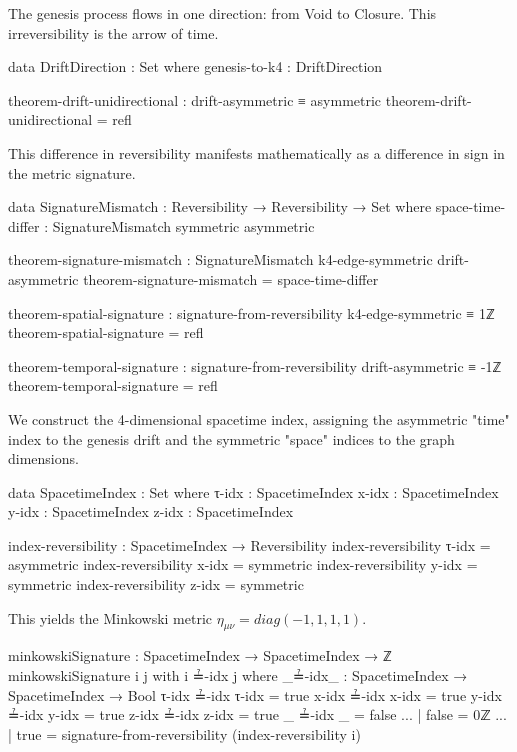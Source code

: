 \documentclass[11pt,a4paper]{book}
\def\text#1{#1}%
\begin{document}
The genesis process flows in one direction: from Void to Closure. This irreversibility is the arrow of time.

\begin{code}
data DriftDirection : Set where
  genesis-to-k4 : DriftDirection

theorem-drift-unidirectional : drift-asymmetric ≡ asymmetric
theorem-drift-unidirectional = refl
\end{code}

This difference in reversibility manifests mathematically as a difference in sign in the metric signature.

\begin{code}
data SignatureMismatch : Reversibility → Reversibility → Set where
  space-time-differ : SignatureMismatch symmetric asymmetric

theorem-signature-mismatch : SignatureMismatch k4-edge-symmetric drift-asymmetric
theorem-signature-mismatch = space-time-differ
\end{code}

\begin{code}
theorem-spatial-signature : signature-from-reversibility k4-edge-symmetric ≡ 1ℤ
theorem-spatial-signature = refl

theorem-temporal-signature : signature-from-reversibility drift-asymmetric ≡ -1ℤ
theorem-temporal-signature = refl
\end{code}

We construct the 4-dimensional spacetime index, assigning the asymmetric "time" index to the genesis drift and the symmetric "space" indices to the graph dimensions.

\begin{code}
data SpacetimeIndex : Set where
  τ-idx : SpacetimeIndex
  x-idx : SpacetimeIndex
  y-idx : SpacetimeIndex
  z-idx : SpacetimeIndex

index-reversibility : SpacetimeIndex → Reversibility
index-reversibility τ-idx = asymmetric
index-reversibility x-idx = symmetric
index-reversibility y-idx = symmetric
index-reversibility z-idx = symmetric
\end{code}

This yields the Minkowski metric $\eta_{\mu\nu} = \text{diag}(-1, 1, 1, 1)$.

\begin{code}
minkowskiSignature : SpacetimeIndex → SpacetimeIndex → ℤ
minkowskiSignature i j with i ≟-idx j
  where
    _≟-idx_ : SpacetimeIndex → SpacetimeIndex → Bool
    τ-idx ≟-idx τ-idx = true
    x-idx ≟-idx x-idx = true
    y-idx ≟-idx y-idx = true
    z-idx ≟-idx z-idx = true
    _     ≟-idx _     = false
... | false = 0ℤ
... | true  = signature-from-reversibility (index-reversibility i)
\end{code}
\end{document}
